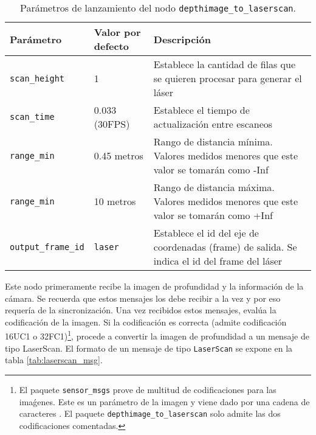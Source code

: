 \begin{table}[H]
\begin{center}
\begin{tabular}{| w{c}{3cm} | w{c}{3cm} | m{7.5cm} |}
	\hline
	Parámetro & Valor por defecto & Descripción \\ \hline
	\texttt{scan\_height} & 1 & Establece la cantidad de filas que se quieren procesar para generar el láser \\ \hline
	\texttt{scan\_time} & 0.033 (30FPS) & Establece el tiempo de actualización entre escaneos \\ \hline
	\texttt{range\_min} & 0.45 metros & Rango de distancia mínima. Valores medidos menores que este valor se tomarán como -Inf \\ \hline
	\texttt{range\_min} & 10 metros & Rango de distancia máxima. Valores medidos menores que este valor se tomarán como +Inf \\ \hline
	\texttt{output\_frame\_id} & \texttt{laser} & Establece el id del eje de coordenadas (frame) de salida. Se indica el id del frame del láser \\ \hline
\end{tabular}
\caption{Parámetros de lanzamiento del nodo \texttt{depthimage\_to\_laserscan}.}
\label{tab:param_depthimage}
\end{center}
\end{table} 

Este nodo primeramente recibe la imagen de profundidad y la información de la cámara. Se recuerda que estos mensajes los debe recibir a la vez y por eso requería de la sincronización. Una vez recibidos estos mensajes, evalúa la codificación de la imagen. Si la codificación es correcta (admite codificación 16UC1 o 32FC1)\footnote{El paquete \texttt{sensor\_msgs} prove de multitud de codificaciones para las imaǵenes. Este es un parámetro de la imagen y viene dado por una cadena de caracteres \cite{enc}. El paquete \texttt{depthimage\_to\_laserscan} solo admite las dos codificaciones comentadas.}, procede a convertir la imagen de profundidad a un mensaje de tipo LaserScan. El formato de un mensaje de tipo \texttt{LaserScan} se expone en la tabla \ref{tab:laserscan_msg}.\\

